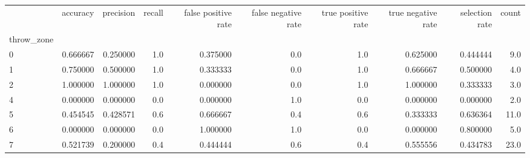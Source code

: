\begin{tabular}{lrrrrrrrrr}
\toprule
{} &  accuracy &  precision &  recall &  false positive rate &  false negative rate &  true positive rate &  true negative rate &  selection rate &  count \\
throw\_zone &           &            &         &                      &                      &                     &                     &                 &        \\
\midrule
0          &  0.666667 &   0.250000 &     1.0 &             0.375000 &                  0.0 &                 1.0 &            0.625000 &        0.444444 &    9.0 \\
1          &  0.750000 &   0.500000 &     1.0 &             0.333333 &                  0.0 &                 1.0 &            0.666667 &        0.500000 &    4.0 \\
2          &  1.000000 &   1.000000 &     1.0 &             0.000000 &                  0.0 &                 1.0 &            1.000000 &        0.333333 &    3.0 \\
4          &  0.000000 &   0.000000 &     0.0 &             0.000000 &                  1.0 &                 0.0 &            0.000000 &        0.000000 &    2.0 \\
5          &  0.454545 &   0.428571 &     0.6 &             0.666667 &                  0.4 &                 0.6 &            0.333333 &        0.636364 &   11.0 \\
6          &  0.000000 &   0.000000 &     0.0 &             1.000000 &                  1.0 &                 0.0 &            0.000000 &        0.800000 &    5.0 \\
7          &  0.521739 &   0.200000 &     0.4 &             0.444444 &                  0.6 &                 0.4 &            0.555556 &        0.434783 &   23.0 \\
\bottomrule
\end{tabular}
